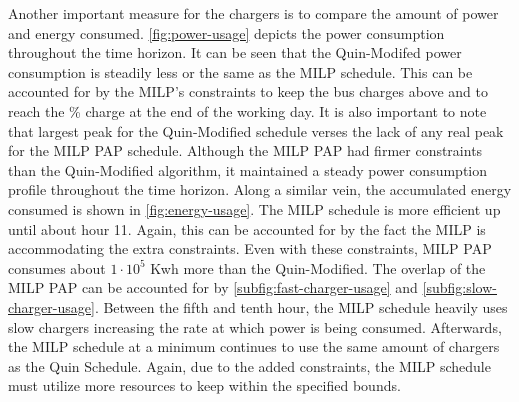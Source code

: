 Another important measure for the chargers is to compare the amount of power and energy consumed.
\autoref{fig:power-usage} depicts the power consumption throughout the time horizon. It can be seen that the
Quin-Modifed power consumption is steadily less or the same as the MILP schedule. This can be accounted for by the
MILP's constraints to keep the bus charges above \mincharge and to reach the \% charge at the end
of the working day. It is also important to note that largest peak for the Quin-Modified schedule verses the lack of any
real peak for the MILP PAP schedule. Although the MILP PAP had firmer constraints than the Quin-Modified algorithm, it
maintained a steady power consumption profile throughout the time horizon. Along a similar vein, the accumulated energy
consumed is shown in \autoref{fig:energy-usage}. The MILP schedule is more efficient up until about hour 11. Again, this
can be accounted for by the fact the MILP is accommodating the extra constraints. Even with these constraints, MILP PAP
consumes about $1\cdot10^5$ Kwh more than the Quin-Modified. The overlap of the MILP PAP can be accounted for by
\autoref{subfig:fast-charger-usage} and \autoref{subfig:slow-charger-usage}. Between the fifth and tenth hour, the MILP
schedule heavily uses slow chargers increasing the rate at which power is being consumed. Afterwards, the MILP schedule
at a minimum continues to use the same amount of chargers as the Quin Schedule. Again, due to the added constraints, the
MILP schedule must utilize more resources to keep within the specified bounds.
